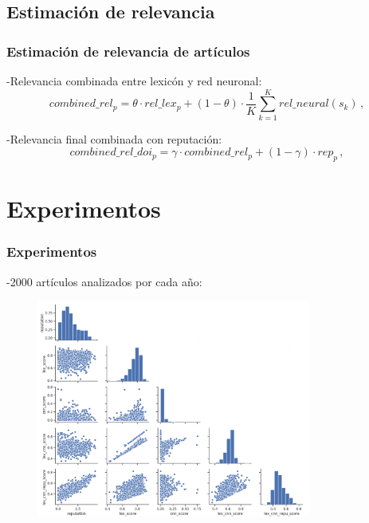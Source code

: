\documentclass[10pt,fleqn]{beamer}
\begin{document}
\subsection{Estimación de relevancia}
\begin{frame} \frametitle{Estimación de relevancia de artículos} 

-Relevancia combinada entre lexicón y red neuronal:
\begin{equation}
	combined\_rel_{p} = \theta \cdot rel\_lex_{p} + (1-\theta) \cdot \frac{1}{K} \sum \limits_{k=1}^K rel\_neural(s_k)\,,
    \label{eq:7}
\end{equation}

-Relevancia final combinada con reputación:
\begin{equation}
	combined\_rel\_doi_{p} = \gamma \cdot combined\_rel_{p} + (1-\gamma)\cdot rep_{p} \,,
    \label{eq:8}
\end{equation}

\end{frame}

\section{Experimentos}

\begin{frame} \frametitle{Experimentos} 

-2000 artículos analizados por cada año:
\begin{figure}  \centering
  \includegraphics[width=9cm, keepaspectratio]{images/2016_results_mod.png}
\end{figure}

\end{frame}
\end{document}

